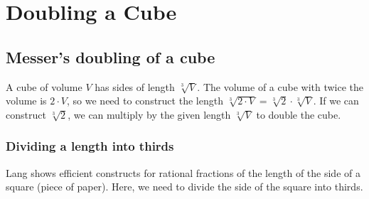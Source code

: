 
\chapter{Doubling a Cube}\label{c.cube}

\section{Messer's doubling of a cube}\label{s.cube1}

A cube of volume $V$ has sides of length $\sqrt[3]{V}$. The volume of a cube with twice the volume is $2\cdot V$, so we need to construct the length $\sqrt[3]{2\cdot V}=\sqrt[3]{2}\cdot \sqrt[3]{V}$. If we can construct $\sqrt[3]{2}$, we can multiply by the given length $\sqrt[3]{V}$ to double the cube.

\subsection{Dividing a length into thirds}

Lang \cite{lang} shows efficient constructs for rational fractions of the length of the side of a square (piece of paper). Here, we need to divide the side of the square into thirds.

